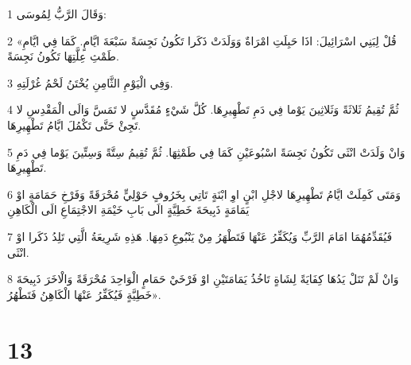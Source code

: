 \par 1 وَقَالَ الرَّبُّ لِمُوسَى:
\par 2 «قُلْ لِبَنِي اسْرَائِيلَ: اذَا حَبِلَتِ امْرَاةٌ وَوَلَدَتْ ذَكَرا تَكُونُ نَجِسَةً سَبْعَةَ ايَّامٍ. كَمَا فِي ايَّامِ طَمْثِ عِلَّتِهَا تَكُونُ نَجِسَةً.
\par 3 وَفِي الْيَوْمِ الثَّامِنِ يُخْتَنُ لَحْمُ غُرْلَتِهِ.
\par 4 ثُمَّ تُقِيمُ ثَلاثَةً وَثَلاثِينَ يَوْما فِي دَمِ تَطْهِيرِهَا. كُلَّ شَيْءٍ مُقَدَّسٍ لا تَمَسَّ وَالَى الْمَقْدِسِ لا تَجِئْ حَتَّى تَكْمُلَ ايَّامُ تَطْهِيرِهَا.
\par 5 وَانْ وَلَدَتْ انْثَى تَكُونُ نَجِسَةً اسْبُوعَيْنِ كَمَا فِي طَمْثِهَا. ثُمَّ تُقِيمُ سِتَّةً وَسِتِّينَ يَوْما فِي دَمِ تَطْهِيرِهَا.
\par 6 وَمَتَى كَمِلَتْ ايَّامُ تَطْهِيرِهَا لاجْلِ ابْنٍ اوِ ابْنَةٍ تَاتِي بِخَرُوفٍ حَوْلِيٍّ مُحْرَقَةً وَفَرْخِ حَمَامَةٍ اوْ يَمَامَةٍ ذَبِيحَةَ خَطِيَّةٍ الَى بَابِ خَيْمَةِ الاجْتِمَاعِ الَى الْكَاهِنِ
\par 7 فَيُقَدِّمُهُمَا امَامَ الرَّبِّ وَيُكَفِّرُ عَنْهَا فَتَطْهَرُ مِنْ يَنْبُوعِ دَمِهَا. هَذِهِ شَرِيعَةُ الَّتِي تَلِدُ ذَكَرا اوْ انْثَى.
\par 8 وَانْ لَمْ تَنَلْ يَدُهَا كِفَايَةً لِشَاةٍ تَاخُذُ يَمَامَتَيْنِ اوْ فَرْخَيْ حَمَامٍ الْوَاحِدَ مُحْرَقَةً وَالْاخَرَ ذَبِيحَةَ خَطِيَّةٍ فَيُكَفِّرُ عَنْهَا الْكَاهِنُ فَتَطْهُرُ».

\chapter{13}


